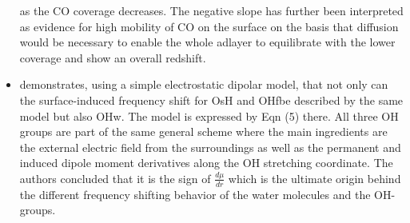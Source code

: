 \documentclass[11pt]{book}
\begin{document}
\begin{itemize}
as the CO coverage decreases. The negative slope has further been
interpreted as evidence for high mobility of CO on the surface on
the basis that diffusion would be necessary to enable the whole adlayer
to equilibrate with the lower coverage and show an overall redshift.
\item \cite{kebede2018red}
demonstrates, using a simple electrostatic dipolar model, that not
only can the surface-induced frequency shift for OsH and OHfbe described
by the same model but also OHw. The model is expressed by Eqn (5)
there. All three OH groups are part of the same general scheme where
the main ingredients are the external electric field from the surroundings
as well as the permanent and induced dipole moment derivatives along
the OH stretching coordinate. The authors concluded that it is the
sign of $\frac{d\mu}{dr}$ which is the ultimate origin behind the
different frequency shifting behavior of the water molecules and the
OH- groups.
\end{itemize}
\end{document}
